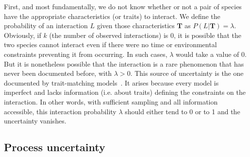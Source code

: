 \documentclass[12pt]{article}
\begin{document}
    First, and most fundamentally, we do not know whether or not a pair of species have the appropriate characteristics (or traits) to interact. We define the probability of an interaction $L$ given those characteristics $\mathbf{T}$ as $P(L | \mathbf{T})=\lambda$. Obviously, if $k$ (the number of observed interactions) is 0, it is possible that the two species cannot interact even if there were no time or environmental constraints preventing it from occurring. In such cases, $\lambda$ would take a value of 0. 
    But it is nonetheless possible that the interaction is a rare phenomenon that has never been documented before, with $\lambda>0$. This source of uncertainty is the one documented by trait-matching models~\citep{Bartomeus2016}. It arises because every model is imperfect and lacks information (i.e. about traits) defining the constraints on the interaction. In other words, with sufficient sampling and all information accessible, this interaction probability $\lambda$ should either tend to 0 or to 1 and the uncertainty vanishes. 

    \subsection*{Process uncertainty} 
\end{document}
